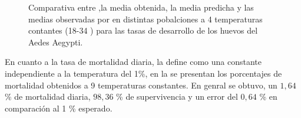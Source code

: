 \begin{figure}
\begin{minipage}{\textwidth}
    \caption{\label{fig:desarrollo-huevo-baserra2006}
    Comparativa entre ,la media obtenida, la media predicha y las medias observadas por \cite{
    BESERRA2006} en distintas pobalciones a 4 temperaturas contantes (18-34 \textcelsius) para
    las tasas de desarrollo de los huevos del Aedes Aegypti.}


\end{minipage}
\end{figure}

En cuanto a la tasa de mortalidad diaria, \cite{otero2006stochastic} la define como una constante
independiente a la temperatura del 1\%, en la  se presentan
los porcentajes de mortalidad obtenidos a 9 temperaturas constantes. En genral se obtuvo, un $1,64$
\% de mortalidad diaria, $98,36$ \% de supervivencia y un error del $0,64$ \% en comparación al 1
\% esperado.

